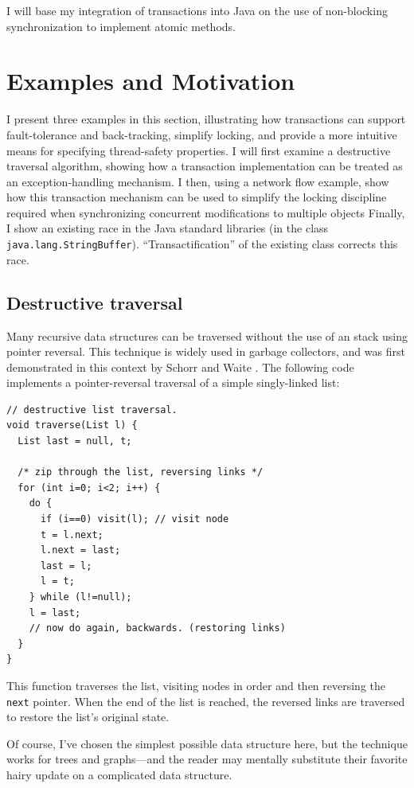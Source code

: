 \documentclass[12pt]{article}
\newcommand{\sis}{\linespread{1.0}\setlength{\baselineskip}{0.8\baselineskip}}
\newcommand{\subsecput}[2]{\subsection{#2}\label{sec:#1}}
\begin{document}
I will base my integration of transactions into Java on the use of
non-blocking synchronization to implement atomic methods.

\section{Examples and Motivation}
I present three examples in this section, illustrating how
transactions can support fault-tolerance and back-tracking,
simplify locking, and provide a more intuitive
means for specifying thread-safety properties.
I will first examine a destructive traversal algorithm, showing how a
transaction implementation can be treated as an exception-handling
mechanism.   I then, using a network flow example, show how this
transaction mechanism can be used to simplify
the locking discipline required when synchronizing concurrent
modifications to multiple objects
Finally, I show an existing race in the Java standard libraries (in 
the class \texttt{java.lang.StringBuffer}).  ``Transactification'' of
the existing class corrects this race.

\subsecput{destruct}{Destructive traversal}
Many recursive data structures can be traversed without the use of an
stack using pointer reversal.  This technique is widely used in
garbage collectors, and was first demonstrated in this context by
Schorr and Waite \cite{SchorrWa67}.  The following code implements a
pointer-reversal traversal of a simple singly-linked list:
 \par {\footnotesize\samepage\sis
\begin{verbatim}
// destructive list traversal.
void traverse(List l) {
  List last = null, t;
  
  /* zip through the list, reversing links */
  for (int i=0; i<2; i++) {
    do {
      if (i==0) visit(l); // visit node
      t = l.next;
      l.next = last;
      last = l;
      l = t;
    } while (l!=null);
    l = last;
    // now do again, backwards. (restoring links)
  }
}
\end{verbatim}
}
This function traverses the list, visiting nodes in order and then
reversing the {\tt next} pointer.  When the end of the list is
reached, the reversed links are traversed to restore the list's original
state.  

Of course, I've chosen the simplest possible data structure here, but
the technique works for trees and graphs---and the reader may mentally
substitute their favorite hairy update on a complicated data
structure.
\end{document}
